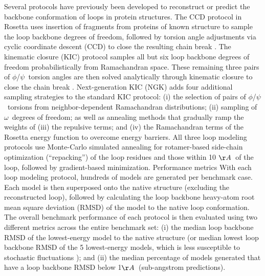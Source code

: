 Several protocols have previously been developed to reconstruct or predict the backbone conformation of loops in protein structures. The CCD protocol in Rosetta \cite{wang_proteinprotein_2007} uses insertion of fragments from proteins of known structure to sample the loop backbone degrees of freedom, followed by torsion angle adjustments via cyclic coordinate descent (CCD) to close the resulting chain break \cite{canutescu_cyclic_2003}. The kinematic closure (KIC) protocol \cite{mandell_sub-angstrom_2009} samples all but six loop backbone degrees of freedom probabilistically from Ramachandran space. These remaining three pairs of $\phi$/$\psi$\ torsion angles are then solved analytically through kinematic closure to close the chain break \cite{coutsias_kinematic_2004}. Next-generation KIC (NGK) \cite{stein_improvements_2013} adds four additional sampling strategies to the standard KIC protocol: (i) the selection of pairs of $\phi$/$\psi$\ torsions from neighbor-dependent Ramachandran distributions; (ii) sampling of $\omega$\ degrees of freedom; as well as annealing methods that gradually ramp the weights of (iii) the repulsive terms; and (iv) the Ramachandran terms of the Rosetta energy function to overcome energy barriers. All three loop modeling protocols use Monte-Carlo simulated annealing for rotamer-based side-chain optimization (“repacking”) of the loop residues and those within 10 $\AA$\ of the loop, followed by gradient-based minimization.
Performance metrics
With each loop modeling protocol, hundreds of models are generated per benchmark case. Each model is then superposed onto the native structure (excluding the reconstructed loop), followed by calculating the loop backbone heavy-atom root mean square deviation (RMSD) of the model to the native loop conformation. The overall benchmark performance of each protocol is then evaluated using two different metrics across the entire benchmark set: (i) the median loop backbone RMSD of the lowest-energy model to the native structure (or median lowest loop backbone RMSD of the 5 lowest-energy models, which is less susceptible to stochastic fluctuations \cite{leaver-fay_chapter_2013}); and (ii) the median percentage of models generated that have a loop backbone RMSD below 1$\AA$\ (sub-angstrom predictions).

